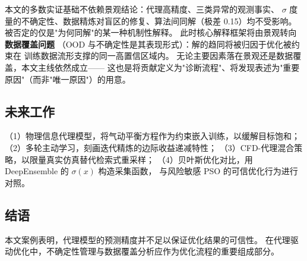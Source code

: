 本文的多数实证基础不依赖景观结论：代理高精度、三类异常的观测事实、
$\sigma$ 度量的不确定性、数据精炼对盲区的修复、算法间同解（极差 0.15）均不受影响。
被否定的仅是"为何同解"的某一种机制性解释。
此时核心解释框架将由景观转向\textbf{数据覆盖问题}
（OOD 与不确定性是其表现形式）：解的趋同将被归因于优化被约束在
训练数据流形支撑的同一高置信区域内。
无论主要因素落在景观还是数据覆盖，本文主线依然成立——
这也是将贡献定义为"诊断流程"、将发现表述为"重要原因"（而非"唯一原因"）的用意。

\subsection{未来工作}

（1）物理信息代理模型，将气动平衡方程作为约束嵌入训练，以缓解目标饱和；
（2）多轮主动学习，刻画迭代精炼的边际收益递减特性；
（3）CFD-代理混合策略，以限量真实仿真替代检索式重采样；
（4）贝叶斯优化对比，用 DeepEnsemble 的 $\sigma(x)$ 构造采集函数，
与风险敏感 PSO 的可信优化行为进行对照。

\subsection{结语}

\begin{chapterquestion}
本文案例表明，代理模型的预测精度并不足以保证优化结果的可信性。
在代理驱动优化中，不确定性管理与数据覆盖分析应作为优化流程的重要组成部分。
\end{chapterquestion}
